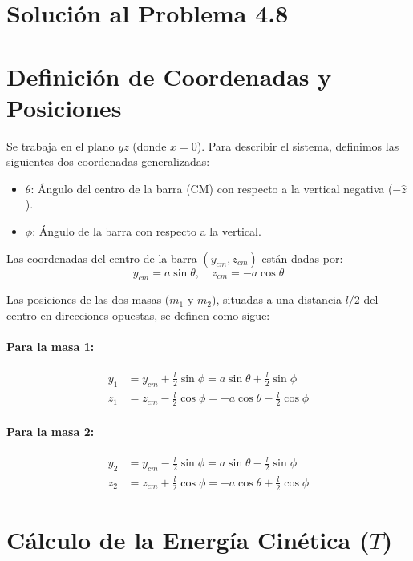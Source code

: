 \documentclass[12pt, a4paper]{article}
\begin{document}
\section{Solución al Problema 4.8}


\section*{Definición de Coordenadas y Posiciones}

Se trabaja en el plano $yz$ (donde $x=0$). Para describir el sistema, definimos las siguientes dos coordenadas generalizadas:
\begin{itemize}
    \item $\theta$: Ángulo del centro de la barra (CM) con respecto a la vertical negativa ($-\hat{z}$).
    \item $\phi$: Ángulo de la barra con respecto a la vertical.
\end{itemize}

Las coordenadas del centro de la barra $(y_{cm}, z_{cm})$ están dadas por:
\begin{equation}
    y_{cm} = a \sin \theta, \quad z_{cm} = -a \cos \theta
\end{equation}

Las posiciones de las dos masas ($m_1$ y $m_2$), situadas a una distancia $l/2$ del centro en direcciones opuestas, se definen como sigue:

\paragraph{Para la masa 1:}
\begin{align}
    y_1 &= y_{cm} + \frac{l}{2} \sin \phi = a \sin \theta + \frac{l}{2} \sin \phi \\
    z_1 &= z_{cm} - \frac{l}{2} \cos \phi = -a \cos \theta - \frac{l}{2} \cos \phi
\end{align}

\paragraph{Para la masa 2:}
\begin{align}
    y_2 &= y_{cm} - \frac{l}{2} \sin \phi = a \sin \theta - \frac{l}{2} \sin \phi \\
    z_2 &= z_{cm} + \frac{l}{2} \cos \phi = -a \cos \theta + \frac{l}{2} \cos \phi
\end{align}

\section*{Cálculo de la Energía Cinética ($T$)}
\end{document}
